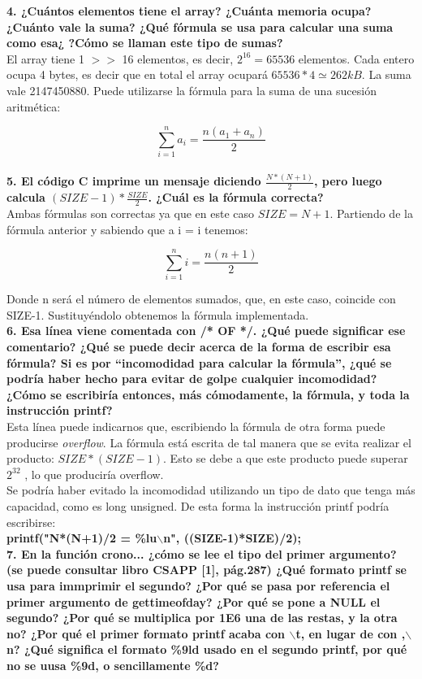 \documentclass[11pt,a4paper]{article}
\begin{document}
\textbf{4. ¿Cuántos elementos tiene el array? ¿Cuánta memoria ocupa? ¿Cuánto vale la suma? ¿Qué fórmula se usa para calcular una suma como esa¿ ?Cómo se llaman este tipo de sumas? } \\	

El array tiene 1 $>>$ 16 elementos, es decir, $2^{16} = 65536$ elementos.
Cada entero ocupa 4 bytes, es decir que en total el array ocupará $65536 * 4 \simeq 262 kB$. 
La suma vale 2147450880. Puede utilizarse la fórmula para la suma de una sucesión aritmética: 

\[\sum_{i=1}^{n}a_i = \frac{n(a_1+a_n)}{2}\] \\

\textbf{5. El código C imprime un mensaje diciendo $\frac{N*(N+1)}{2}$, pero  luego calcula $(SIZE-1)*\frac{SIZE}{2}$. ¿Cuál es la fórmula correcta? } \\

Ambas fórmulas son correctas ya que en este caso $SIZE = N+1$. Partiendo de la fórmula anterior y sabiendo que a i = i tenemos:

\[\sum_{i=1}^{n}i = \frac{n(n+1)}{2}\] 

Donde n será el número de elementos sumados, que, en este caso, coincide con SIZE-1. Sustituyéndolo obtenemos la fórmula implementada. \\

\textbf{6. Esa línea viene comentada con /* OF */. ¿Qué puede  significar ese comentario? ¿Qué se puede decir acerca de la forma de  escribir esa fórmula? Si es por “incomodidad para calcular la fórmula”, ¿qué se podría haber hecho para evitar de golpe cualquier incomodidad? ¿Cómo  se  escribiría entonces, más cómodamente, la fórmula, y toda la instrucción printf? } \\

Esta línea puede indicarnos que, escribiendo la fórmula de otra forma puede producirse \emph{overflow}. La fórmula está escrita de tal manera que se evita realizar el producto: $SIZE * (SIZE -1)$. Esto se debe a que este producto puede superar $2^{32}$ , lo que produciría overflow. \\
Se podría haber evitado la incomodidad utilizando un tipo de dato que tenga más capacidad, como es long unsigned. De esta forma la instrucción printf podría escribirse:\\
\textbf{printf("N*(N+1)/2 = \%lu$\backslash$n", ((SIZE-1)*SIZE)/2);} \\

\textbf{7. En  la  función crono... ¿cómo se lee el  tipo del primer  argumento? (se puede consultar libro CS\:APP [1], pág.287) ¿Qué formato printf se usa para immprimir el segundo? ¿Por qué se pasa por referencia el primer argumento de gettimeofday? ¿Por qué se pone a NULL el segundo? ¿Por qué se multiplica por 1E6 una de las restas, y la otra no? ¿Por qué el primer formato printf acaba con $\backslash$t, en lugar de con ,$\backslash$n? ¿Qué significa el formato \%9ld usado en el segundo printf, por qué no se uusa \%9d, o sencillamente \%d? } \\
\end{document}
